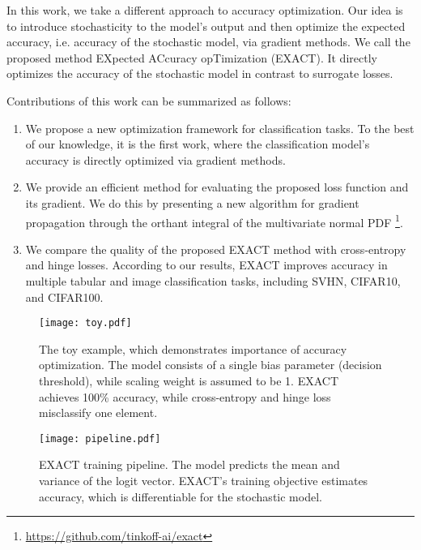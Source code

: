 \documentclass[nohyperref]{article}
\theoremstyle{plain}
\theoremstyle{definition}
\theoremstyle{remark}
\begin{document}
In this work, we take a different approach to accuracy optimization. Our idea is to introduce stochasticity to the model's output and then optimize the expected accuracy, i.e. accuracy of the stochastic model, via gradient methods.
We call the proposed method EXpected ACcuracy opTimization (EXACT). It directly optimizes the accuracy of the stochastic model in contrast to surrogate losses.


Contributions of this work can be summarized as follows:
\begin{enumerate}
\item{We propose a new optimization framework for classification tasks. To the best of our knowledge, it is the first work, where the classification model's accuracy is directly optimized via gradient methods.}
\item{We provide an efficient method for evaluating the proposed loss function and its gradient. We do this by presenting a new algorithm for gradient propagation through the orthant integral of the multivariate normal PDF \footnote{\url{https://github.com/tinkoff-ai/exact}}.}

\item{We compare the quality of the proposed EXACT method with cross-entropy and hinge losses. According to our results, EXACT improves accuracy in multiple tabular and image classification tasks, including SVHN, CIFAR10, and CIFAR100.}
\end{enumerate}

\begin{figure}[t]
\vskip 0.1in
\centering
\texttt{[image: toy.pdf]}
\caption{The toy example, which demonstrates importance of accuracy optimization. The model consists of a single bias parameter (decision threshold), while scaling weight is assumed to be 1. EXACT achieves 100\% accuracy, while cross-entropy and hinge loss misclassify one element.}
\label{fig:toy}
\vskip -0.1in
\end{figure}

\begin{figure*}[ht]
\vskip 0.0in
\begin{center}
\centerline{\texttt{[image: pipeline.pdf]}}
\caption{EXACT training pipeline. The model predicts the mean and variance of the logit vector. EXACT's training objective estimates accuracy, which is differentiable for the stochastic model.}
\label{fig:pipeline}
\end{center}
\vskip -0.2in
\end{figure*}
\end{document}
